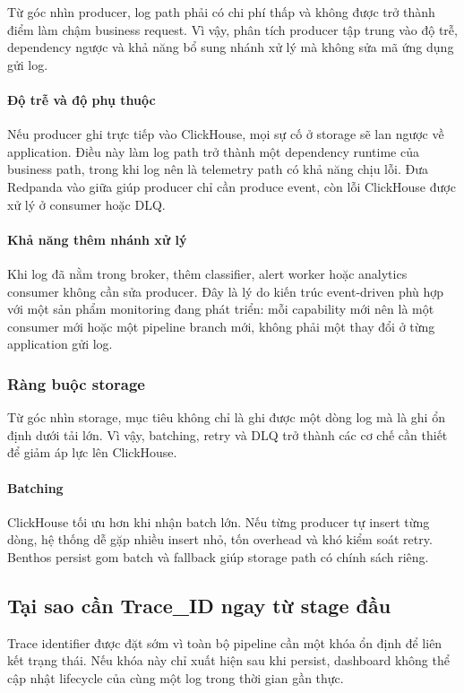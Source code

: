 Từ góc nhìn producer, log path phải có chi phí thấp và không được trở thành điểm làm chậm business request. Vì vậy, phân tích producer tập trung vào độ trễ, dependency ngược và khả năng bổ sung nhánh xử lý mà không sửa mã ứng dụng gửi log.
\paragraph{Độ trễ và độ phụ thuộc}
Nếu producer ghi trực tiếp vào ClickHouse, mọi sự cố ở storage sẽ lan ngược về application. Điều này làm log path trở thành một dependency runtime của business path, trong khi log nên là telemetry path có khả năng chịu lỗi. Đưa Redpanda vào giữa giúp producer chỉ cần produce event, còn lỗi ClickHouse được xử lý ở consumer hoặc DLQ.
\paragraph{Khả năng thêm nhánh xử lý}
Khi log đã nằm trong broker, thêm classifier, alert worker hoặc analytics consumer không cần sửa producer. Đây là lý do kiến trúc event-driven phù hợp với một sản phẩm monitoring đang phát triển: mỗi capability mới nên là một consumer mới hoặc một pipeline branch mới, không phải một thay đổi ở từng application gửi log.
\subsubsection{Ràng buộc storage}

Từ góc nhìn storage, mục tiêu không chỉ là ghi được một dòng log mà là ghi ổn định dưới tải lớn. Vì vậy, batching, retry và DLQ trở thành các cơ chế cần thiết để giảm áp lực lên ClickHouse.
\paragraph{Batching}
ClickHouse tối ưu hơn khi nhận batch lớn. Nếu từng producer tự insert từng dòng, hệ thống dễ gặp nhiều insert nhỏ, tốn overhead và khó kiểm soát retry. Benthos persist gom batch và fallback giúp storage path có chính sách riêng.

\subsection{Tại sao cần Trace\_ID ngay từ stage đầu}

Trace identifier được đặt sớm vì toàn bộ pipeline cần một khóa ổn định để liên kết trạng thái. Nếu khóa này chỉ xuất hiện sau khi persist, dashboard không thể cập nhật lifecycle của cùng một log trong thời gian gần thực.
